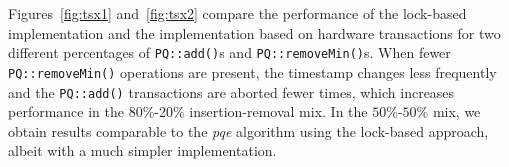 


Figures~\ref{fig:tsx1} and~\ref{fig:tsx2} compare the performance of the lock-based implementation and the implementation based on hardware transactions for two different percentages of \texttt{PQ::add()}s and \texttt{PQ::removeMin()}s. When fewer \texttt{PQ::removeMin()} operations are present, the timestamp changes less frequently and the \texttt{PQ::add()} transactions are aborted fewer times, which increases performance  in the 80\%-20\% insertion-removal mix. In the $50\%$-$50\%$ mix, we obtain results comparable to the \emph{pqe} algorithm using the lock-based approach, albeit with a much simpler implementation.


